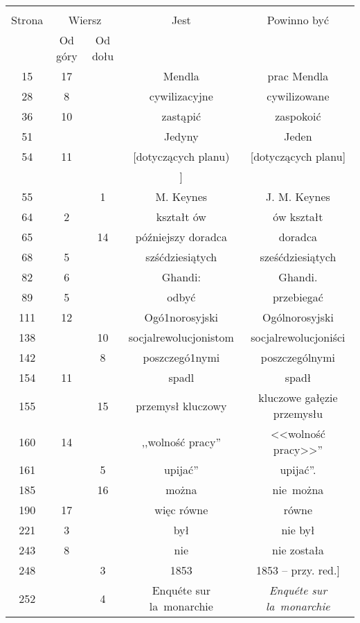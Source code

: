 \documentclass[a4paper,11pt]{article}
\begin{document}
\newpage
{}
\begin{center}
  \begin{tabular}{|c|c|c|c|c|}
    \hline
    & \multicolumn{2}{c|}{} & & \\
    Strona & \multicolumn{2}{c|}{Wiersz} & Jest
                              & Powinno być \\ \cline{2-3}
    & Od góry & Od dołu & & \\
    \hline
    15  & 17 & & Mendla & prac Mendla \\
    28  &  8 & & cywilizacyjne & cywilizowane \\
    36  & 10 & & zastąpić & zaspokoić \\
    51  & & & Jedyny & Jeden \\ %
    54  & 11 & & [dotyczących planu) & [dotyczących planu] \\
    & & & ] & \\
    55  & &  1 & M. Keynes & J. M. Keynes \\
    64  &  2 & & kształt ów & ów kształt \\
    65  & & 14 & późniejszy doradca & doradca \\
    68  &  5 & & szśćdziesiątych & sześćdziesiątych \\
    82  &  6 & & Ghandi: & Ghandi. \\
    89  &  5 & & odbyć & przebiegać \\
    111 & 12 & & Ogó1norosyjski & Ogólnorosyjski \\
    138 & & 10 & socjalrewolucjonistom & socjalrewolucjoniści \\
    142 & &  8 & poszczegó1nymi & poszczególnymi \\
    154 & 11 & & spadl & spadł \\
    155 & & 15 & przemysł kluczowy & kluczowe gałęzie przemysłu \\
    160 & 14 & & ,,wolność pracy'' & <<wolność pracy>>'' \\
    161 & &  5 & upijać'' & upijać''. \\
    185 & & 16 & można & nie~można \\
    190 & 17 & & więc równe & równe \\
    221 &  3 & & był & nie był \\
    243 &  8 & & nie & nie została \\
    248 & &  3 & 1853 & 1853 -- przy. red.] \\
    252 & &  4 & Enqu\'{e}te sur la~monarchie
           & \emph{Enqu\'{e}te sur la~monarchie} \\

\end{tabular}
\end{center}
\end{document}
